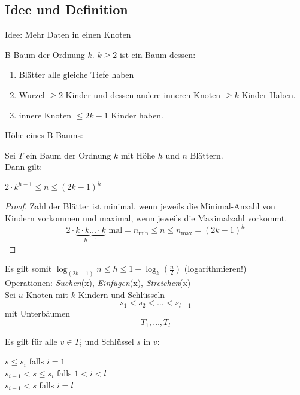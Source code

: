         \subsection{Idee und Definition}            
            Idee: Mehr Daten in einen Knoten 
            \begin{definition}
                B-Baum der Ordnung $k$. $k \geq 2$ ist ein Baum dessen: \\
                \begin{enumerate}[1]
                    \item Blätter alle gleiche Tiefe haben 
                    \item Wurzel $\geq 2$ Kinder und dessen andere inneren Knoten $\geq k$ Kinder Haben.
                    \item innere Knoten $\leq 2k-1$ Kinder haben. \\
                \end{enumerate}
            \end{definition}

            Höhe eines B-Baums: \\
            \begin{lemma}
                Sei $T$ ein Baum der Ordnung $k$ mit Höhe $h$ und $n$ Blättern. \\
                Dann gilt: \\
                \begin{center}
                    $2 \cdot k^{h-1} \leq n \leq (2k-1)^h$ 
                \end{center}
                \begin{proof}
                    Zahl der Blätter ist minimal, wenn jeweils die Minimal-Anzahl von Kindern vorkommen und maximal, wenn jeweils die Maximalzahl 
                    vorkommt.
                    $$2 \cdot \underbrace{k \cdot k \ldots \cdot k}_{h-1} \text{ mal} = n_{\min} \leq n \leq n_{\max} = (2k-1)^h$$
                \end{proof}

                Es gilt somit $\log_{(2k-1)} n \leq h \leq 1+ \log_k (\frac{n}{2})$ (logarithmieren!)\\
                Operationen: \textit{Suchen}(x), \textit{Einfügen}(x), \textit{Streichen}(x) \\
                Sei $u$ Knoten mit $k$ Kindern und Schlüsseln 
                $$s_1 < s_2 < \ldots < s_{l-1}$$ mit Unterbäumen $$T_1, \ldots , T_l$$
                         
                Es gilt für alle $v \in T_i$ und Schlüssel $s$ in $v$: \\
                \begin{center}
                    $s \leq s_i$ falls $i=1$ \\
                    $s_{i-1} < s \leq s_i$ falls $1 < i < l$ \\
                    $s_{i-1} < s$ falls $i=l$ 
                \end{center}
            \end{lemma}

